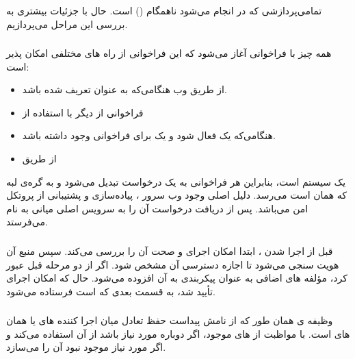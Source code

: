 تمامی‌پردازشی که در  انجام می‌شود ناهمگام () است. حال با جزئیات بیشتری به بررسی این مراحل می‌پردازیم.

\subsubsection*{}

همه چیز با فراخوانی  آغاز می‌شود که این فراخوانی از راه های مختلفی امکان پذیر است:

\begin{itemize}

	\item از طریق وب هنگامی‌که  به عنوان  تعریف شده باشد.
	
	\item فراخوانی از  دیگر با استفاده از 
	
	\item هنگامی‌که یک  فعال شود و یک  برای فراخوانی  وجود داشته باشد.
	
	\item از طریق 
	
\end{itemize}

 یک سیستم  است، بنابراین هر فراخوانی  به یک درخواست  تبدیل می‌شود و به گره‌ی لبه که همان  است می‌رسد. دلیل اصلی وجود وب سرور ، پیاده‌سازی و پشتیبانی از پروتکل امن  می‌باشد.  پس از دریافت درخواست آن را به سرویس اصلی میانی به نام  می‌فرستد.

\subsubsection*{}

قبل از اجرا شدن ، ابتدا  امکان اجرای و صحت آن را بررسی می‌کند. سپس منبع آن هویت سنجی می‌شود تا اجازه دسترسی آن مشخص شود. اگر  از دو مرحله قبل عبور کرد، مؤلفه های اضافی به عنوان پیکربندی به آن افزوده می‌شود. حال که امکان اجرای  تأیید شد، به قسمت بعدی که  است فرستاده می‌شود.

\subsubsection*{}

وظیفه ی  همان طور که از نامش پیداست حفظ تعادل میان اجرا کننده های  یا همان  های  است.  با مواظبت از  های  موجود، اگر دوباره مورد نیاز باشد از آن استفاده می‌کند و اگر  مورد نیاز موجود نبود آن را می‌سازد.

